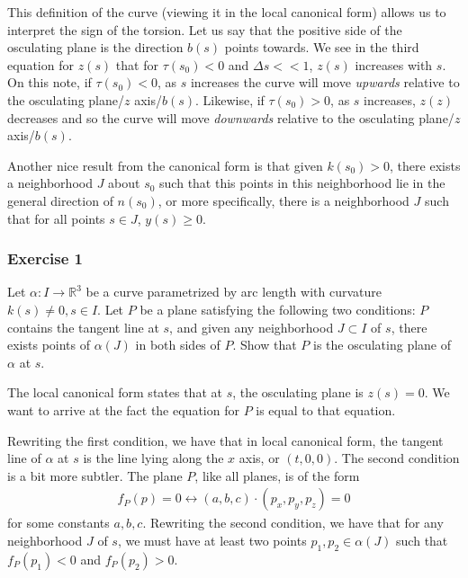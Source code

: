 \documentclass{article}
\newcommand{\R}{\mathbb{R}}
\begin{document}
	This definition of the curve (viewing it in the local canonical form) allows us to interpret the sign of the torsion. Let us say that the positive side of the osculating plane is the direction $b(s)$ points towards. We see in the third equation for $z(s)$ that for $\tau(s_0) < 0$ and $\Delta s << 1$, $z(s)$ increases with $s$. On this note, if $\tau(s_0) < 0$, as $s$ increases the curve will move \textit{upwards} relative to the osculating plane/$z$ axis/$b(s)$. Likewise, if $\tau(s_0) > 0$, as $s$ increases, $z(z)$ decreases and so the curve will move \textit{downwards} relative to the osculating plane/$z$ axis/$b(s)$.
	
	Another nice result from the canonical form is that given $k(s_0) > 0$, there exists a neighborhood $J$ about $s_0$ such that this points in this neighborhood lie in the general direction of $n(s_0)$, or more specifically, there is a neighborhood $J$ such that for all points $s \in J$, $y(s) \geq 0$.
	
	\subsubsection*{Exercise 1}
	Let $\alpha: I \to \R^3$ be a curve parametrized by arc length with curvature $k(s) \neq 0, s \in I$. Let $P$ be a plane satisfying the following two conditions: $P$ contains the tangent line at $s$, and given any neighborhood $J \subset I$ of $s$, there exists points of $\alpha(J)$ in both sides of $P$. Show that $P$ is the osculating plane of $\alpha$ at $s$.
	
	The local canonical form states that at $s$, the osculating plane is $z(s) = 0$. We want to arrive at the fact the equation for $P$ is equal to that equation.
	
	Rewriting the first condition, we have that in local canonical form, the tangent line of $\alpha$ at $s$ is the line lying along the $x$ axis, or $(t, 0, 0)$. The second condition is a bit more subtler. The plane $P$, like all planes, is of the form
	\begin{gather*}
		f_P(p) = 0 \leftrightarrow (a, b, c) \cdot (p_x, p_y, p_z) = 0
	\end{gather*}
	for some constants $a, b, c$. Rewriting the second condition, we have that for  any neighborhood $J$ of $s$, we must have at least two points $p_1, p_2 \in \alpha(J)$ such that $f_P(p_1) < 0$ and $f_P(p_2) > 0$.
	
\end{document}
